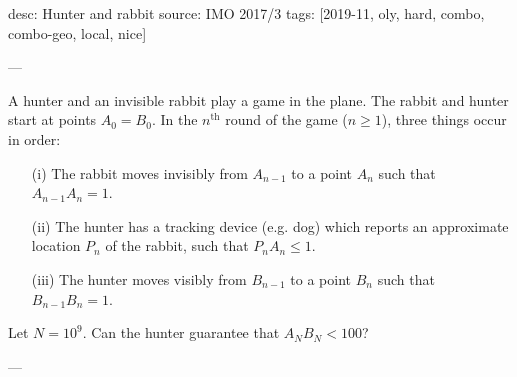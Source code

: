 desc: Hunter and rabbit
source: IMO 2017/3
tags: [2019-11, oly, hard, combo, combo-geo, local, nice]

---

A hunter and an invisible rabbit play a game in the plane.
The rabbit and hunter start at points $A_0=B_0$. In the $n^\text{th}$ round of the game ($n\ge1$), three things occur in order:
\begin{itemize}
    \item[(i)] The rabbit moves invisibly from $A_{n-1}$ to a point $A_n$ such that $A_{n-1}A_n=1$.
    \item[(ii)] The hunter has a tracking device (e.g. dog) which reports an approximate location $P_n$ of the rabbit, such that $P_nA_n\le1$.
    \item[(iii)] The hunter moves visibly from $B_{n-1}$ to a point $B_n$ such that $B_{n-1}B_n=1$.
\end{itemize}
Let $N=10^9$. Can the hunter guarantee that $A_NB_N<100$?

---

